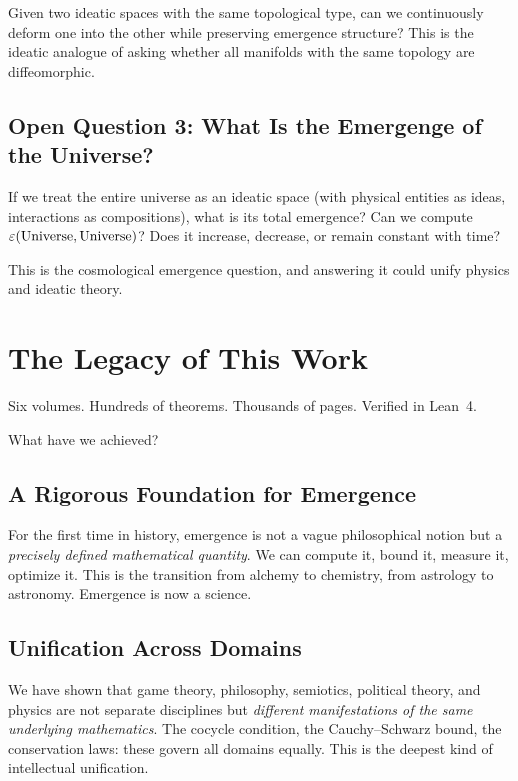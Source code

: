 Given two ideatic spaces with the same topological type, can we continuously
deform one into the other while preserving emergence structure? This is the
ideatic analogue of asking whether all manifolds with the same topology are
diffeomorphic.

\subsection{Open Question 3: What Is the Emergenge of the Universe?}

If we treat the entire universe as an ideatic space (with physical entities
as ideas, interactions as compositions), what is its total emergence? Can we
compute $\varepsilon(\text{Universe}, \text{Universe})$? Does it increase, decrease,
or remain constant with time?

This is the cosmological emergence question, and answering it could unify
physics and ideatic theory.


\section{The Legacy of This Work}

Six volumes. Hundreds of theorems. Thousands of pages. Verified in Lean~4.

What have we achieved?

\subsection{A Rigorous Foundation for Emergence}

For the first time in history, emergence is not a vague philosophical notion
but a \emph{precisely defined mathematical quantity}. We can compute it,
bound it, measure it, optimize it. This is the transition from alchemy to
chemistry, from astrology to astronomy. Emergence is now a science.

\subsection{Unification Across Domains}

We have shown that game theory, philosophy, semiotics, political theory, and
physics are not separate disciplines but \emph{different manifestations of
the same underlying mathematics}. The cocycle condition, the Cauchy--Schwarz
bound, the conservation laws: these govern all domains equally. This is the
deepest kind of intellectual unification.

